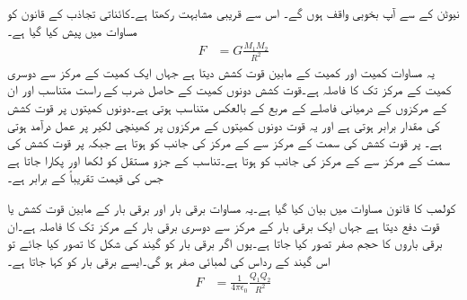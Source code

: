 نیوٹن کے  سے آپ بخوبی واقف ہوں گے۔ اس سے قریبی مشابہت رکھتا ہے۔کائناتی تجاذب کے قانون کو مساوات  میں پیش کیا گیا ہے۔
\begin{align}\label{مساوات_کولوم_کشش_ثقل}
F&=G \frac{M_1 M_2}{R^2}
\end{align}
یہ مساوات کمیت  اور کمیت  کے مابین قوت کشش  دیتا ہے جہاں ایک کمیت کے مرکز سے دوسری کمیت کے مرکز تک کا فاصلہ  ہے۔قوت کشش دونوں کمیت کے حاصل ضرب کے  راست متناسب اور ان کے مرکزوں کے درمیانی فاصلے  کے مربع کے بالعکس متناسب ہوتی ہے۔دونوں کمیتوں پر قوت کشش کی مقدار برابر ہوتی ہے اور یہ قوت دونوں کمیتوں کے  مرکزوں پر کھینچی لکیر پر عمل درآمد ہوتی ہے۔ پر قوت کشش کی سمت  کے مرکز سے  کے مرکز کی جانب کو ہوتا ہے جبکہ  پر قوت کشش کی سمت  کے مرکز سے  کے مرکز کی جانب کو ہوتا ہے۔تناسب کے جزو مستقل کو  لکھا اور  پکارا جاتا ہے جس کی قیمت تقریباً  کے برابر ہے۔

کولمب کا قانون مساوات  میں بیان کیا گیا ہے۔یہ مساوات برقی بار  اور برقی بار  کے مابین قوت کشش یا قوت دفع  دیتا ہے جہاں ایک برقی بار کے مرکز سے دوسری برقی بار کے مرکز تک کا فاصلہ  ہے۔ان برقی باروں کا حجم صفر تصور کیا جاتا ہے۔یوں اگر برقی بار کو گیند کی شکل کا تصور کیا جائے تو اس گیند کے رداس  کی لمبائی صفر ہو گی۔ایسے برقی بار کو  کہا جاتا ہے۔
\begin{align}\label{مساوات_کولوم_کولمب_کشش_بار}
F&=\frac{1}{4 \pi \epsilon_0}\frac{Q_1 Q_2}{ R^2}
\end{align}

